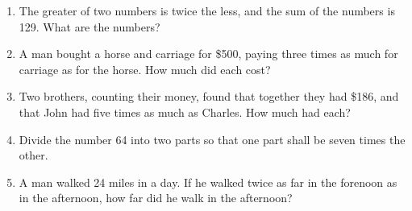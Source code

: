 \documentclass[12pt,oneside]{book}
\begin{document}
\begin{enumerate}
    \item The greater of two numbers is twice the less, and the sum of the numbers is 129. What are the numbers?
    \item A man bought a horse and carriage for \$500, paying three times as much for carriage as for the horse.
    How much did each cost?
    \item Two brothers, counting their money, found that together they had \$186, and that John had five times as
    much as Charles. How much had each? 
    \item Divide the number 64 into two parts so that one part shall be seven times the other. 
    \item A man walked 24 miles in a day. If he walked twice as far in the forenoon as in the afternoon, how far did
    he walk in the afternoon? 
\end{enumerate}
\end{document}
